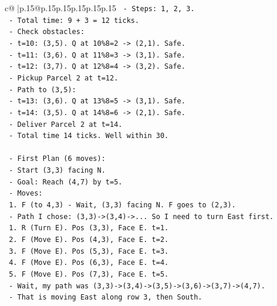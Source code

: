 \documentclass{article}
\begin{document}
{\begin{supertabular}{c@{$\;$}|p{.15\linewidth}@{}p{.15\linewidth}p{.15\linewidth}p{.15\linewidth}p{.15\linewidth}p{.15\linewidth}}
{{{\texttt{            {-} Steps: 1, 2, 3.} \\
\texttt{            {-} Total time: 9 + 3 = 12 ticks.} \\
\texttt{            {-} Check obstacles:} \\
\texttt{              {-} t=10: (3,5). Q at 10\%8=2 {-}> (2,1). Safe.} \\
\texttt{              {-} t=11: (3,6). Q at 11\%8=3 {-}> (3,1). Safe.} \\
\texttt{              {-} t=12: (3,7). Q at 12\%8=4 {-}> (3,2). Safe.} \\
\texttt{            {-} Pickup Parcel 2 at t=12.} \\
\texttt{            {-} Path to (3,5):} \\
\texttt{              {-} t=13: (3,6). Q at 13\%8=5 {-}> (3,1). Safe.} \\
\texttt{              {-} t=14: (3,5). Q at 14\%8=6 {-}> (2,1). Safe.} \\
\texttt{            {-} Deliver Parcel 2 at t=14.} \\
\texttt{            {-} Total time 14 ticks. Well within 30.} \\
\\ 
\texttt{        {-} First Plan (6 moves):} \\
\texttt{          {-} Start (3,3) facing N.} \\
\texttt{          {-} Goal: Reach (4,7) by t=5.} \\
\texttt{          {-} Moves:} \\
\texttt{            1. F (to 4,3) {-} Wait, (3,3) facing N. F goes to (2,3).} \\
\texttt{               {-} Path I chose: (3,3){-}>(3,4){-}>... So I need to turn East first.} \\
\texttt{            1. R (Turn E). Pos (3,3), Face E. t=1.} \\
\texttt{            2. F (Move E). Pos (4,3), Face E. t=2.} \\
\texttt{            3. F (Move E). Pos (5,3), Face E. t=3.} \\
\texttt{            4. F (Move E). Pos (6,3), Face E. t=4.} \\
\texttt{            5. F (Move E). Pos (7,3), Face E. t=5.} \\
\texttt{               {-} Wait, my path was (3,3){-}>(3,4){-}>(3,5){-}>(3,6){-}>(3,7){-}>(4,7).} \\
\texttt{               {-} That is moving East along row 3, then South.} \\
}}}
\end{supertabular}}
\end{document}
